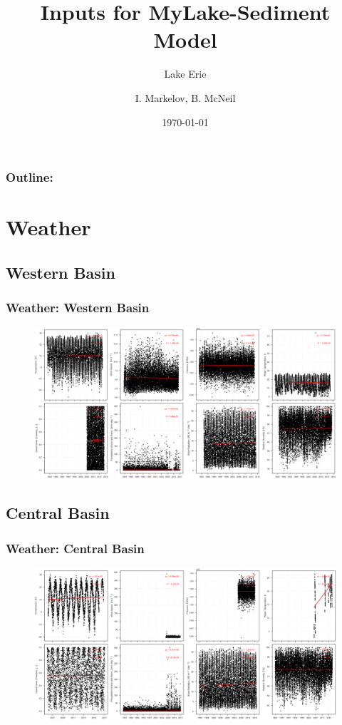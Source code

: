 \documentclass{beamer}
\title{Inputs for MyLake-Sediment Model}
\subtitle{Lake Erie}
\author{I. Markelov, B. McNeil}
\institute{Ecohydrology}
\date{\today}
\begin{document}
\begin{frame}
\titlepage
\end{frame}


\begin{frame}
\frametitle{Outline:}
\begin{center}
\tableofcontents
\end{center}
\end{frame}

\section{Weather}
\label{sec:weather}

\subsection{Western Basin}
\label{sub:wes}

\begin{frame}
\frametitle{Weather: Western Basin}

\begin{figure}
\includegraphics[width=\textwidth]{weather/western basin weather.png}
\end{figure}

\end{frame}

\subsection{Central Basin}
\label{sub:cen}

\begin{frame}
\frametitle{Weather: Central Basin}

\begin{figure}
\includegraphics[width=\textwidth]{weather/central basin weather.png}
\end{figure}

\end{frame}
\end{document}
